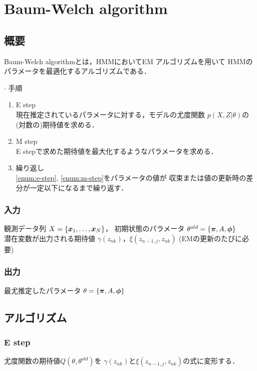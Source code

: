 \section{Baum-Welch algorithm}
\label{sec:Baum-Welch}
\subsection{概要}
\label{sec:Baum-Welch:abst}
Baum-Welch algorithmとは，HMMにおいてEM アルゴリズムを用いて
HMMのパラメータを最適化するアルゴリズムである．
\vspace{\baselineskip}

$\cdot$ 手順
\begin{enumerate}
\item E step \label{enum:e-step} \\
  現在推定されているパラメータに対する，モデルの尤度関数
  $p(X,Z|\theta)$の(対数の)期待値を求める．
\item M step \label{enum:m-step} \\
  E stepで求めた期待値を最大化するようなパラメータを求める．
\item 繰り返し \\
  \ref{enum:e-step}, \ref{enum:m-step}をパラメータの値が
  収束または値の更新時の差分が一定以下になるまで繰り返す．
\end{enumerate}
\subsubsection{入力}
\label{sec:Baum-Welch:input}
観測データ列 $X=\{\mbox{\boldmath $x$}_1,\dots,\mbox{\boldmath $x$}_N\}$，
初期状態のパラメータ
$\theta^{old} = \{\mbox{\boldmath $\pi$}, A, \mbox{\boldmath $\phi$}\}$ \\
\hphantom{潜}潜在変数が出力される期待値
$\gamma(z_{nk})$，$\xi(z_{n-1,j},z_{nk})$ 
(EMの更新のたびに必要)
\subsubsection{出力}
\label{sec:Baum-Welch:output}
最尤推定したパラメータ $\theta = \{\mbox{\boldmath $\pi$}, A, \mbox{\boldmath $\phi$}\}$
\subsection{アルゴリズム}
\label{sec:Baum-Welch:algorithm}
\subsubsection{E step}
\label{sec:Baum-Welch:e-step}
尤度関数の期待値$Q(\theta, \theta^{old})$を
$\gamma(z_{nk})$と$\xi(z_{n-1,j},z_{nk})$の式に変形する．

